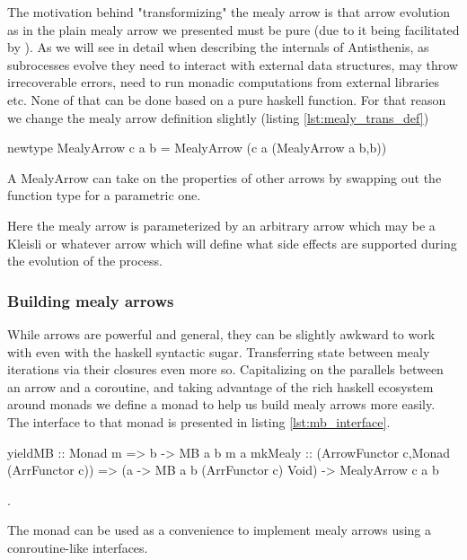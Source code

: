 The motivation behind "transformizing" the mealy arrow is that arrow
evolution as in the plain mealy arrow we presented must be pure (due
to it being facilitated by \hask{->}). As we will see in detail when
describing the internals of Antisthenis, as subrocesses evolve they
need to interact with external data structures, may throw
irrecoverable errors, need to run monadic computations from external
libraries etc. None of that can be done based on a pure haskell
function. For that reason we change the mealy arrow definition
slightly (listing \ref{lst:mealy_trans_def})

\begin{code}
\begin{haskellcode}
newtype MealyArrow c a b =
  MealyArrow (c a (MealyArrow a b,b))
\end{haskellcode}
  \caption{\label{lst:mealy_trans_def}A MealyArrow can take on the
    properties of other arrows by swapping out the function \hask{->}
    type for a parametric one.}
\end{code}

Here the mealy arrow is parameterized by an arbitrary arrow  which
may be a Kleisli or whatever arrow which will define what side effects
are supported during the evolution of the process.

\subsubsection{Building mealy arrows}

While arrows are powerful and general, they can be slightly awkward to
work with even with the haskell  syntactic
sugar. Transferring state between mealy iterations via their closures
even more so. Capitalizing on the parallels between an arrow and a
coroutine, and taking advantage of the rich haskell ecosystem around
monads we define a monad  to help us build mealy arrows
more easily. The interface to that monad is presented in listing
\ref{lst:mb_interface}.

\begin{code}
\begin{haskellcode}
yieldMB :: Monad m => b -> MB a b m a
mkMealy :: (ArrowFunctor c,Monad (ArrFunctor c))
        => (a -> MB a b (ArrFunctor c) Void)
        -> MealyArrow c a b
\end{haskellcode}
\label{lst:mb_interface}.
\caption{The  monad can be used as a convenience to
  implement mealy arrows using a conroutine-like interfaces.}
\end{code}

